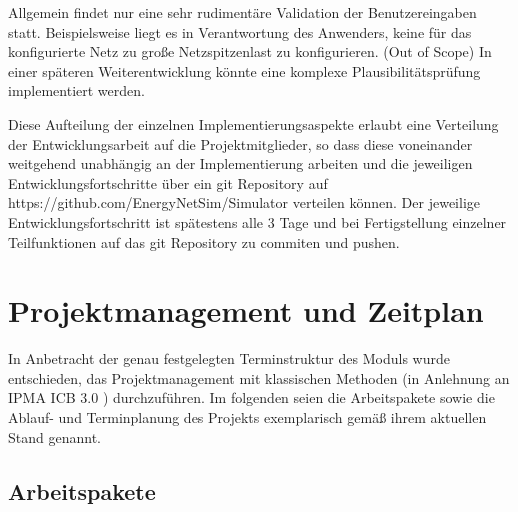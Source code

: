 Allgemein findet nur eine sehr rudimentäre Validation der Benutzereingaben statt. Beispielsweise liegt es in Verantwortung des Anwenders, keine für das konfigurierte Netz zu große Netzspitzenlast zu konfigurieren. (Out of Scope) In einer späteren Weiterentwicklung könnte eine komplexe Plausibilitätsprüfung implementiert werden.
 
Diese Aufteilung der einzelnen Implementierungsaspekte erlaubt eine Verteilung der Entwicklungsarbeit auf die Projektmitglieder, so dass diese voneinander weitgehend unabhängig an der Implementierung arbeiten und die jeweiligen Entwicklungsfortschritte über ein git Repository auf https://github.com/EnergyNetSim/Simulator verteilen können. Der jeweilige Entwicklungsfortschritt ist spätestens alle 3 Tage und bei Fertigstellung einzelner Teilfunktionen auf das git Repository zu commiten und pushen.

\section{Projektmanagement und Zeitplan}
In Anbetracht der genau festgelegten Terminstruktur des Moduls wurde entschieden, das Projektmanagement mit klassischen Methoden (in Anlehnung an IPMA ICB 3.0 \citep{icb}) durchzuführen. Im folgenden seien die Arbeitspakete sowie die Ablauf- und Terminplanung des Projekts exemplarisch gemäß ihrem aktuellen Stand genannt. 
 
\subsection{Arbeitspakete}

